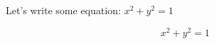 \documentclass[12pt]{article}
\begin{document}
Let's write some equation: \(x^2 + y^2 = 1\)

\[x^2 + y^2 = 1\]
\end{document}
